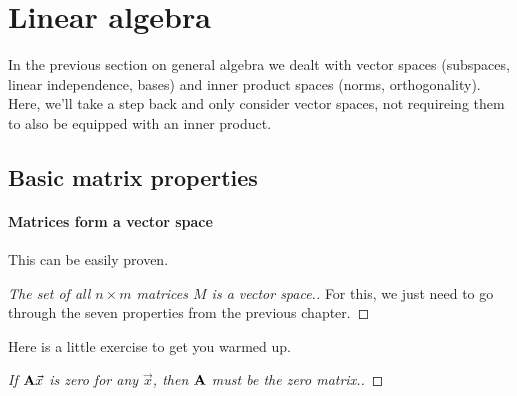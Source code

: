 \section{Linear algebra}

In the previous section on general algebra we dealt with vector spaces (subspaces, linear independence, bases) and inner product spaces (norms, orthogonality). Here, we'll take a step back and only consider vector spaces, not requireing them to also be equipped with an inner product. 


\subsection{Basic matrix properties}

\paragraph{Matrices form a vector space} This can be easily proven.

\begin{proof}[The set of all $n \times m$ matrices $M$ is a vector space.] For this, we just need to go through the seven properties from the previous chapter. 

    
    
\end{proof}


Here is a little exercise to get you warmed up. 

\begin{proof}[If $\mathbf{A}\vec{x}$ is zero for any $\vec{x}$, then $\mathbf{A}$ must be the zero matrix.]


\end{proof}


